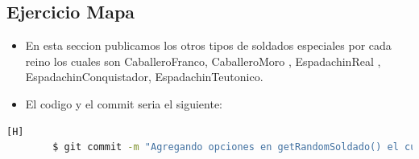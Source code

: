 \documentclass{article}
\begin{document}
	\subsection{Ejercicio Mapa}
	\begin{itemize}	
		\item En esta seccion publicamos los otros tipos de soldados especiales por cada reino los cuales son CaballeroFranco, CaballeroMoro , EspadachinReal , EspadachinConquistador, EspadachinTeutonico.
		\item El codigo y el commit seria el siguiente:
	\end{itemize}	
	\begin{lstlisting}[language=bash,caption={Commit}][H]
		$ git commit -m "Agregando opciones en getRandomSoldado() el cual serian estas clases heredadas anteriormente respetando si estas pertenecen a cierto reino especifico tambien modificamos el metodo obtenerIncial() el cual tambien agregamos las inciales de cada tipo de Soldado y tambien en el metodo fillarray() el cual creara a cada soldado dependiendo el tipo que sea con un constructor seria solo agregar mas clases heredadas en resumen "
	\end{lstlisting}	
\end{document}
